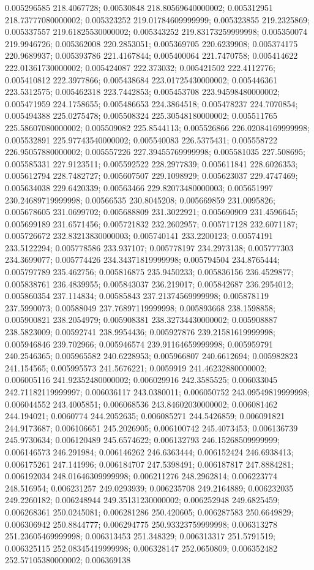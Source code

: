 0.005296585 218.4067728; 0.00530848 218.80569640000002; 0.005312951 218.73777080000002; 0.005323252 219.01784609999999; 0.005323855 219.2325869; 0.005337557 219.61825530000002; 0.005343252 219.83173259999998; 0.005350074 219.9946726; 0.005362008 220.2853051; 0.005369705 220.6239908; 0.005374175 220.9689937; 0.005393786 221.4167844; 0.005400064 221.7470758; 0.005414622 222.01361730000002; 0.005424087 222.373032; 0.005421502 222.4112776; 0.005410812 222.3977866; 0.005438684 223.01725430000002; 0.005446361 223.5312575; 0.005462318 223.7442853; 0.005453708 223.94598480000002; 0.005471959 224.1758655; 0.005486653 224.3864518; 0.005478237 224.7070854; 0.005494388 225.0275478; 0.005508324 225.30548180000002; 0.005511765 225.58607080000002; 0.005509082 225.8544113; 0.005526866 226.02084169999998; 0.005532891 225.97743540000002; 0.005540083 226.5375431; 0.005558722 226.95057880000002; 0.005557226 227.39455769999998; 0.005581035 227.508695; 0.005585331 227.9123511; 0.005592522 228.2977839; 0.005611841 228.6026353; 0.005612794 228.7482727; 0.005607507 229.1098929; 0.005623037 229.4747469; 0.005634038 229.6420339; 0.00563466 229.82073480000003; 0.005651997 230.24689719999998; 0.00566535 230.8045208; 0.005669859 231.0095826; 0.005678605 231.0699702; 0.005688809 231.3022921; 0.005690909 231.4596645; 0.005699189 231.6571456; 0.005721832 232.2602957; 0.005717128 232.6071187; 0.005726672 232.83213830000003; 0.005740141 233.2200123; 0.00574191 233.5122294; 0.005778586 233.937107; 0.005778197 234.2973138; 0.005777303 234.3699077; 0.005774426 234.34371819999998; 0.005794504 234.8765444; 0.005797789 235.462756; 0.005816875 235.9450233; 0.005836156 236.4529877; 0.005838761 236.4839955; 0.005843037 236.219017; 0.005842687 236.2954012; 0.005860354 237.114834; 0.00585843 237.21374569999998; 0.005878119 237.5990073; 0.00588049 237.76897119999998; 0.005893668 238.1598858; 0.005900821 238.2054979; 0.005908381 238.32734430000002; 0.005908887 238.5823009; 0.00592741 238.9954436; 0.005927876 239.21581619999998; 0.005946846 239.702966; 0.005946574 239.91164659999998; 0.005959791 240.2546365; 0.005965582 240.6228953; 0.005966807 240.6612694; 0.005982823 241.154565; 0.005995573 241.5676221; 0.0059919 241.46232880000002; 0.006005116 241.92352480000002; 0.006029916 242.3585525; 0.006033045 242.71182119999997; 0.006036117 243.0380011; 0.006050752 243.09549819999998; 0.006044552 243.4005851; 0.006068536 243.84602030000002; 0.006081462 244.194021; 0.0060774 244.2052635; 0.006085271 244.5426859; 0.006091821 244.9173687; 0.006106651 245.2026905; 0.006100742 245.4073453; 0.006136739 245.9730634; 0.006120489 245.6574622; 0.006132793 246.15268509999999; 0.006146573 246.291984; 0.006146262 246.6363444; 0.006152424 246.6938413; 0.006175261 247.141996; 0.006184707 247.5398491; 0.006187817 247.8884281; 0.006192034 248.01646309999998; 0.006211276 248.2962814; 0.006223774 248.516954; 0.006231257 249.0293939; 0.006235708 249.2164889; 0.006232035 249.2260182; 0.006248944 249.35131230000002; 0.006252948 249.6825459; 0.006268361 250.0245081; 0.006281286 250.420605; 0.006287583 250.6649829; 0.006306942 250.8844777; 0.006294775 250.93323759999998; 0.006313278 251.23605469999998; 0.006313453 251.348329; 0.006313317 251.5791519; 0.006325115 252.08345419999998; 0.006328147 252.0650809; 0.006352482 252.57105380000002; 0.006369138 